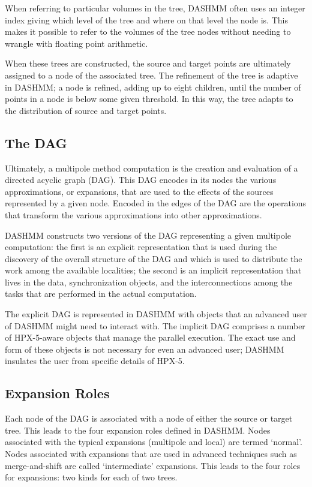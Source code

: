 When referring to particular volumes in the tree, DASHMM often uses an integer
index giving which level of the tree and where on that level the node is. This
makes it possible to refer to the volumes of the tree nodes without needing to
wrangle with floating point arithmetic.

When these trees are constructed, the source and target points are ultimately
assigned to a node of the associated tree. The refinement of the tree is
adaptive in DASHMM; a node is refined, adding up to eight children, until the
number of points in a node is below some given threshold. In this way, the
tree adapts to the distribution of source and target points.

\subsection{The DAG}

Ultimately, a multipole method computation is the creation and evaluation of
a directed acyclic graph (DAG). This DAG encodes in its nodes the various
approximations, or expansions, that are used to the effects of the sources
represented by a given node. Encoded in the edges of the DAG are the operations
that transform the various approximations into other approximations.

DASHMM constructs two versions of the DAG representing a given multipole
computation: the first is an explicit representation that is used during the
discovery of the overall structure of the DAG and which is used to distribute
the work among the available localities; the second is an implicit
representation that lives in the data, synchronization objects, and the
interconnections among the tasks that are performed in the actual computation.

The explicit DAG is represented in DASHMM with objects that an advanced user of
DASHMM might need to interact with. The implicit DAG comprises a number of
HPX-5-aware objects that manage the parallel execution. The exact use and form
of these objects is not necessary for even an advanced user; DASHMM insulates
the user from specific details of HPX-5.

\subsection{Expansion Roles}

Each node of the DAG is associated with a node of either the source or target
tree. This leads to the four expansion roles defined in DASHMM. Nodes
associated with the typical expansions (multipole and local) are termed
`normal'. Nodes associated with expansions that are used in advanced techniques
such as merge-and-shift are called `intermediate' expansions. This leads to
the four roles for expansions: two kinds for each of two trees.

